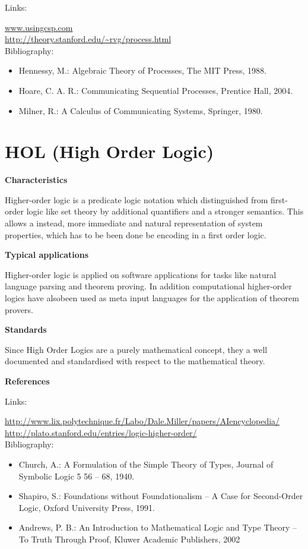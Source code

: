 \documentclass{./template/openetcs_report}
\begin{document}
Links:

\url{www.usingcsp.com} \\[4pt]
\url{http://theory.stanford.edu/~rvg/process.html} \\[4pt]

Bibliography:

\begin{itemize}
\item Hennessy, M.: Algebraic Theory of Processes, The MIT Press, 1988.
\item Hoare, C. A. R.: Communicating Sequential Processes, Prentice Hall, 2004.
\item Milner, R.: A Calculus of Communicating Systems, Springer, 1980.
\end{itemize}

\section{HOL (High Order Logic)}

	\textbf{Characteristics}

Higher-order logic is a predicate logic notation which distinguished from first-order logic like set theory by additional quantifiers and a stronger semantics. This allows a instead, more immediate and natural representation of system properties, which has to be been done be encoding in a first order logic.

	\textbf{Typical applications}

Higher-order logic is applied on software applications for tasks like natural language parsing and theorem proving. In addition computational higher-order logics have alsobeen used as meta input languages for the application of theorem provers. 

	\textbf{Standards}

Since High Order Logics are a purely mathematical concept, they a well documented and standardised with respect to the mathematical theory.

	\textbf{References}

Links:

\url{http://www.lix.polytechnique.fr/Labo/Dale.Miller/papers/AIencyclopedia/} \\[4pt]
\url{http://plato.stanford.edu/entries/logic-higher-order/} \\[4pt]

Bibliography:

\begin{itemize}
\item Church, A.: A Formulation of the Simple Theory of Types, Journal of Symbolic Logic 5 56 – 68, 1940.
\item Shapiro, S.: Foundations without Foundationalism -- A Case for Second-Order Logic, Oxford University Press, 1991.
\item Andrews, P. B.: An Introduction to Mathematical Logic and Type Theory -- To Truth Through Proof, Kluwer Academic Publishers, 2002
\end{itemize}
\end{document}
